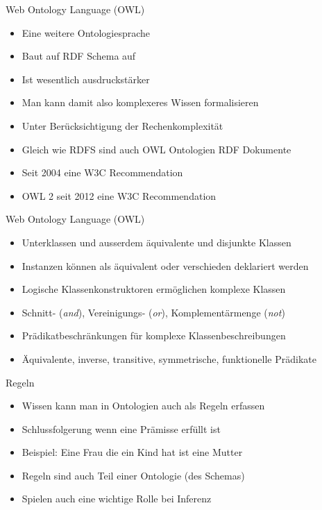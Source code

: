 \documentclass{beamer}
\begin{document}
\begin{frame}{Web Ontology Language (OWL)}
	
	\begin{itemize}
		\item Eine weitere Ontologiesprache
		\item Baut auf RDF Schema auf
		\item Ist wesentlich ausdruckstärker
		\item Man kann damit also komplexeres Wissen formalisieren
		\item Unter Berücksichtigung der Rechenkomplexität
		\item Gleich wie RDFS sind auch OWL Ontologien RDF Dokumente
		\item Seit 2004 eine W3C Recommendation
		\item OWL 2 seit 2012 eine W3C Recommendation
	\end{itemize}
	
\end{frame}

\begin{frame}{Web Ontology Language (OWL)}
	
	\begin{itemize}
		\item Unterklassen und ausserdem äquivalente und disjunkte Klassen
		\item Instanzen können als äquivalent oder verschieden deklariert werden
		\item Logische Klassenkonstruktoren ermöglichen komplexe Klassen
		\item Schnitt- (\emph{and}), Vereinigungs- (\emph{or}), Komplementärmenge (\emph{not})
		\item Prädikatbeschränkungen für komplexe Klassenbeschreibungen
		\item Äquivalente, inverse, transitive, symmetrische, funktionelle Prädikate
	\end{itemize}
	
\end{frame}

\begin{frame}{Regeln}
	
	\begin{itemize}
		\item Wissen kann man in Ontologien auch als Regeln erfassen
		\item Schlussfolgerung wenn eine Prämisse erfüllt ist
		\item Beispiel: Eine Frau die ein Kind hat ist eine Mutter
		\item Regeln sind auch Teil einer Ontologie (des Schemas)
		\item Spielen auch eine wichtige Rolle bei Inferenz
	\end{itemize}
	
\end{frame}
\end{document}
